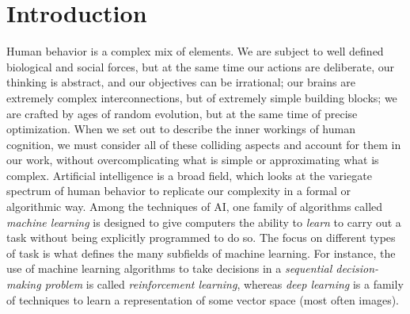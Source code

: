 \chapter{Introduction}
\label{ch1_intro}
\thispagestyle{empty}

\vspace{0.5cm}
 
Human behavior is a complex mix of elements. We are subject to 
well defined biological and social forces, but at the same time our actions are 
deliberate, our thinking is abstract, and our objectives can be irrational; 
our brains are extremely complex interconnections, but of extremely simple 
building blocks; we are crafted by ages of random evolution, but at the same 
time of precise optimization. 
When we set out to describe the inner workings of human cognition, we must 
consider all of these colliding aspects and account for them in our work, 
without overcomplicating what is simple or approximating what is complex.
Artificial intelligence is a broad field, which looks at the variegate spectrum 
of human behavior to replicate our complexity in a formal or algorithmic way. 
Among the techniques of AI, one family of algorithms called \textit{machine
learning} is designed to give computers the ability to \textit{learn} to carry 
out a task without being explicitly programmed to do so. 
The focus on different types of task is what defines the many subfields of 
machine learning.
For instance, the use of machine learning algorithms to take decisions in a 
\textit{sequential decision-making problem} is called \textit{reinforcement 
learning}, whereas \textit{deep learning} is a family of techniques to learn a 
representation of some vector space (most often images).

